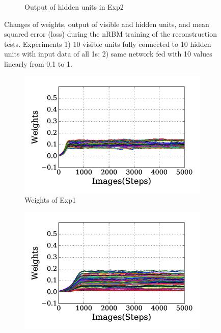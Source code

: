 \begin{figure}
\begin{subfigure}[t]{0.45\textwidth}
		\caption{Output of hidden units in Exp2}
	\end{subfigure}
	\caption{Changes of weights, output of visible and hidden units, and mean squared error (loss) during the nRBM training of the reconstruction tests. 
		Experiments 1) 10 visible units fully connected to 10 hidden units with input data of all 1s; 2) \DIFaddbeginFL {}\DIFaddendFL same network fed with 10 values \DIFdelbeginFL {}\DIFdelendFL \DIFaddbeginFL {}\DIFaddendFL linearly from 0.1 to 1.}
	\label{fig:rbm_orig}
\end{figure}

\begin{figure}
	\centering
	\begin{subfigure}[t]{0.45\textwidth}
		\includegraphics[width=\textwidth]{pics_sdlm/31_exp_RBM_noise/exp1_weights_s.png}
		\caption{Weights of Exp1}
	\end{subfigure}
	\begin{subfigure}[t]{0.45\textwidth}
		\includegraphics[width=\textwidth]{pics_sdlm/31_exp_RBM_noise/exp2_weights_s.png}

\end{subfigure}
\end{figure}
